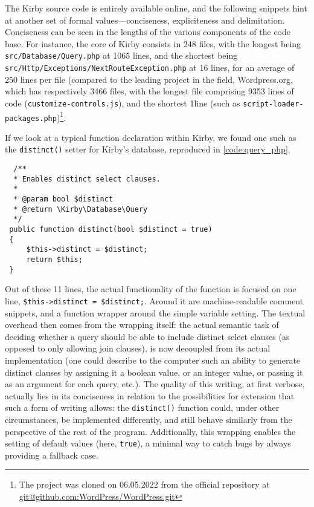The Kirby source code is entirely available online, and the following snippets hint at another set of formal values—conciseness, expliciteness and delimitation. Conciseness can be seen in the lengths of the various components of the code base. For instance, the core of Kirby consists in 248 files, with the longest being \lstinline{src/Database/Query.php} at 1065 lines, and the shortest being \lstinline{src/Http/Exceptions/NextRouteException.php} at 16 lines, for an average of 250 lines per file (compared to the leading project in the field, Wordpress.org, which has respectively 3466 files, with the longest file comprising 9353 lines of code (\lstinline{customize-controls.js}), and the shortest 1line (such as \lstinline{script-loader-packages.php})\footnote{The project was cloned on 06.05.2022 from the official repository at \url{git@github.com:WordPress/WordPress.git}}.

If we look at a typical function declaration within Kirby, we found one such as the \lstinline{distinct()} setter for Kirby's database, reproduced in \ref{code:query_php}.

\begin{listing}
  \begin{verbatim}
  /**
  * Enables distinct select clauses.
  *
  * @param bool $distinct
  * @return \Kirby\Database\Query
  */
 public function distinct(bool $distinct = true)
 {
     $this->distinct = $distinct;
     return $this;
 }
\end{verbatim}
  \caption{Query.php}
  \label{code:query_php}
\end{listing}

Out of these 11 lines, the actual functionality of the function is focused on one line, \lstinline{$this->distinct = $distinct;}. Around it are machine-readable comment snippets, and a function wrapper around the simple variable setting. The textual overhead then comes from the wrapping itself: the actual semantic task of deciding whether a query should be able to include distinct select clauses (as opposed to only allowing join clauses), is now decoupled from its actual implementation (one could describe to the computer such an ability to generate distinct clauses by assigning it a boolean value, or an integer value, or passing it as an argument for each query, etc.). The quality of this writing, at first verbose, actually lies in its conciseness in relation to the possibilities for extension that such a form of writing allows: the \lstinline{distinct()} function could, under other circumstances, be implemented differently, and still behave similarly from the perspective of the rest of the program. Additionally, this wrapping enables the setting of default values (here, \lstinline{true}), a minimal way to catch bugs by always providing a fallback case.

